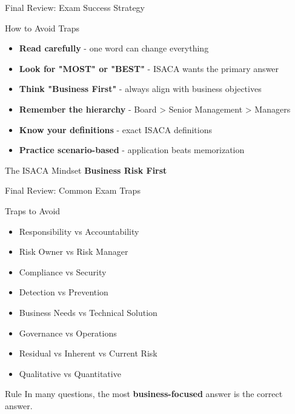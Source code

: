 \documentclass{beamer}
\begin{document}
	\begin{frame}{Final Review: Exam Success Strategy}
		\begin{block}{How to Avoid Traps}
			\begin{itemize}
				\item \textbf{Read carefully} - one word can change everything
				\item \textbf{Look for "MOST" or "BEST"} - ISACA wants the primary answer
				\item \textbf{Think "Business First"} - always align with business objectives
				\item \textbf{Remember the hierarchy} - Board > Senior Management > Managers
				\item \textbf{Know your definitions} - exact ISACA definitions
				\item \textbf{Practice scenario-based} - application beats memorization
			\end{itemize}
		\end{block}
		\begin{exampleblock}{The ISACA Mindset}
			\centering
			\Large{\textbf{Business Risk First}}
		\end{exampleblock}
	\end{frame}
	
	\begin{frame}{Final Review: Common Exam Traps}
		\begin{block}{Traps to Avoid}
			\begin{itemize}
				\item Responsibility vs Accountability
				\item Risk Owner vs Risk Manager
				\item Compliance vs Security
				\item Detection vs Prevention
				\item Business Needs vs Technical Solution
				\item Governance vs Operations
				\item Residual vs Inherent vs Current Risk
				\item Qualitative vs Quantitative
			\end{itemize}
		\end{block}
		\begin{alertblock}{Rule}
			In many questions, the most \textbf{business-focused} answer is the correct answer.
		\end{alertblock}
	\end{frame}
	
\end{document}
